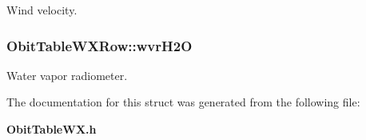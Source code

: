 Wind velocity. 

\subsubsection{ {\bf Obit\-Table\-WXRow::wvr\-H2O}}\label{structObitTableWXRow_o15}


Water vapor radiometer. 



The documentation for this struct was generated from the following file:\begin{CompactItemize}
\item 
{\bf Obit\-Table\-WX.h}\end{CompactItemize}
